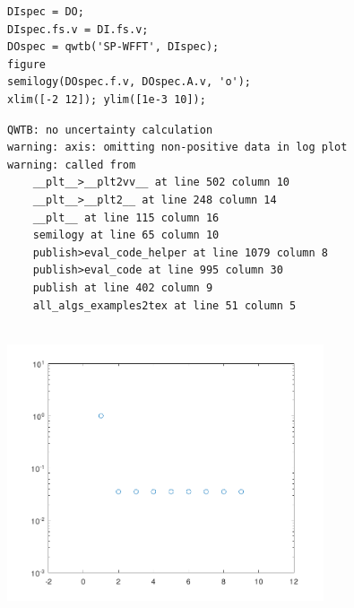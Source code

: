 \begin{lstlisting}
DIspec = DO;
DIspec.fs.v = DI.fs.v;
DOspec = qwtb('SP-WFFT', DIspec);
figure
semilogy(DOspec.f.v, DOspec.A.v, 'o');
xlim([-2 12]); ylim([1e-3 10]);
\end{lstlisting}
\begin{lstlisting}[language={},xleftmargin=5pt,frame=none]
QWTB: no uncertainty calculation
warning: axis: omitting non-positive data in log plot
warning: called from
    __plt__>__plt2vv__ at line 502 column 10
    __plt__>__plt2__ at line 248 column 14
    __plt__ at line 115 column 16
    semilogy at line 65 column 10
    publish>eval_code_helper at line 1079 column 8
    publish>eval_code at line 995 column 30
    publish at line 402 column 9
    all_algs_examples2tex at line 51 column 5
 

\end{lstlisting}
\begin{center}
\includegraphics[width=0.7\textwidth]{algs_examples_published/GenNHarm_alg_example-4.pdf}
\end{center}


\stopcontents[localtoc]
